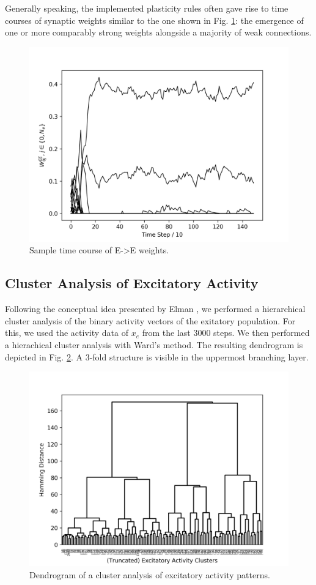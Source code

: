 \documentclass[10pt,a4paper]{article}
\begin{document}
Generally speaking, the implemented plasticity rules often gave rise to time courses of synaptic weights similar to the one shown in Fig. \ref{fig:w_ee_sample_time}: the emergence of one or more comparably strong weights alongside a majority of weak connections.

\begin{figure}
\includegraphics[width=\textwidth]{../plots/w_ee_sample_time.png}
\caption{\label{fig:w_ee_sample_time} Sample time course of E->E weights.}
\end{figure}

\subsection{Cluster Analysis of Excitatory Activity}

Following the conceptual idea presented by Elman \cite{Elman_1990}, we performed a hierarchical cluster analysis of the binary activity vectors of the exitatory population. For this, we used the activity data of $x_e$ from the last $3000$  steps. We then performed a hierachical cluster analysis with Ward's method. The resulting dendrogram is depicted in Fig. \ref{fig:act_dendrogram}. A 3-fold structure is visible in the uppermost branching layer.

\begin{figure}
\includegraphics[width=\textwidth]{../plots/act_dendrogram.png}
\caption{\label{fig:act_dendrogram} Dendrogram of a cluster analysis of excitatory activity patterns.}
\end{figure}

\newpage


\end{document}
